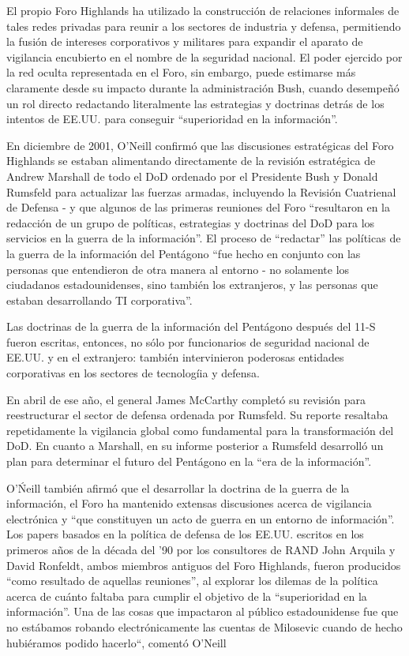 \documentclass[10pt,a5paper,twoside,spanish,]{book}
\begin{document}
El propio Foro Highlands ha utilizado la construcción de relaciones
informales de tales redes privadas para reunir a los sectores de
industria y defensa, permitiendo la fusión de intereses corporativos y
militares para expandir el aparato de vigilancia encubierto en el nombre
de la seguridad nacional. El poder ejercido por la red oculta
representada en el Foro, sin embargo, puede estimarse más claramente
desde su impacto durante la administración Bush, cuando desempeñó un rol
directo redactando literalmente las estrategias y doctrinas detrás de
los intentos de EE.UU. para conseguir ``superioridad en la
información''.

En diciembre de 2001, O'Neill confirmó que las discusiones estratégicas
del Foro Highlands se estaban alimentando directamente de la revisión
estratégica de Andrew Marshall de todo el DoD ordenado por el Presidente
Bush y Donald Rumsfeld para actualizar las fuerzas armadas, incluyendo
la Revisión Cuatrienal de Defensa - y que algunos de las primeras
reuniones del Foro ``resultaron en la redacción de un grupo de
políticas, estrategias y doctrinas del DoD para los servicios en la
guerra de la información''. El proceso de ``redactar'' las políticas de
la guerra de la información del Pentágono ``fue hecho en conjunto con
las personas que entendieron de otra manera al entorno - no solamente
los ciudadanos estadounidenses, sino también los extranjeros, y las
personas que estaban desarrollando TI corporativa''.

Las doctrinas de la guerra de la información del Pentágono después del
11-S fueron escritas, entonces, no sólo por funcionarios de seguridad
nacional de EE.UU. y en el extranjero: también intervinieron poderosas
entidades corporativas en los sectores de tecnologíia y defensa.

En abril de ese año, el general James McCarthy completó su revisión para
reestructurar el sector de defensa ordenada por Rumsfeld. Su reporte
resaltaba repetidamente la vigilancia global como fundamental para la
transformación del DoD. En cuanto a Marshall, en su informe posterior a
Rumsfeld desarrolló un plan para determinar el futuro del Pentágono en
la ``era de la información''.

O'Ńeill también afirmó que el desarrollar la doctrina de la guerra de la
información, el Foro ha mantenido extensas discusiones acerca de
vigilancia electrónica y ``que constituyen un acto de guerra en un
entorno de información''. Los papers basados en la política de defensa
de los EE.UU. escritos en los primeros años de la década del '90 por los
consultores de RAND John Arquila y David Ronfeldt, ambos miembros
antiguos del Foro Highlands, fueron producidos ``como resultado de
aquellas reuniones'', al explorar los dilemas de la política acerca de
cuánto faltaba para cumplir el objetivo de la ``superioridad en la
información''. Una de las cosas que impactaron al público estadounidense
fue que no estábamos robando electrónicamente las cuentas de Milosevic
cuando de hecho hubiéramos podido hacerlo``, comentó O'Neill
\end{document}
